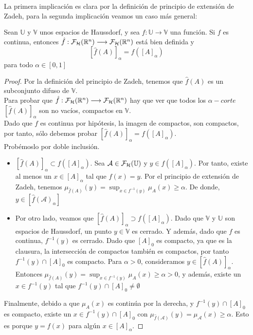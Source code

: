 La primera implicación es clara por la definición de principio de extensión de Zadeh, para la segunda implicación veamos un caso más general:


\begin{teorema}
	Sean $\mathbb{U}$ y $\mathbb{V}$ unos espacios de Haussdorf, y sea $f: \mathbb{U} \longrightarrow \mathbb{V}$ una función. Si $f$ es continua, entonces  $\hat{f} : \mathcal{F}_\mathcal{H}(\mathbb R^n) \longrightarrow \mathcal{F}_\mathcal{H}(\mathbb R^n)$ está bien definida y $$[\hat{f}(A)]_\alpha = f([A]_\alpha)$$
	para todo $\alpha \in [0, 1]$
\end{teorema}

\begin{proof}
	Por la definición del principio de Zadeh, tenemos que $\hat{f}(A)$ es un subconjunto difuso de $\mathbb{V}$. \\
	Para probar que $\hat{f} : \mathcal{F}_\mathcal{H}(\mathbb R^n) \longrightarrow \mathcal{F}_\mathcal{H}(\mathbb R^n)$ hay que ver que todos los $\alpha-corte$ $[\hat{f}(A)]_\alpha$ son no vacíos, compactos en $\mathbb{V}$. \\
	Dado que $f$ es continua por hipótesis, la imagen de compactos, son compactos, por tanto, sólo debemos probar $[\hat{f}(A)]_\alpha = f([A]_\alpha)$. \\
	Probémoslo por doble inclusión.
	
	\begin{itemize}
		\item $[\hat{f}(A)]_\alpha \subset f([A]_\alpha)$. Sea $\mathcal{A} \in \mathcal{F}_\mathcal{H}(\mathbb U)$ y $y \in f([A]_\alpha)$. Por tanto, existe al menos un $x \in [A]_\alpha$ tal que $f(x)=y$. Por el principio de extensión de Zadeh, tenemos $\mu_{\hat{f}(A)}(y)=\sup_{x\in f^{-1}(y)} \mu_A(x) \geq \alpha$. De donde, $y \in [\hat{f}(\mathcal{A})_\alpha]$
		\item Por otro lado, veamos que $[\hat{f}(A)]_\alpha \supset f([A]_\alpha)$. Dado que $\mathbb{V}$ y $\mathbb{U}$ son espacios de Haussdorf, un punto $y \in \mathbb{V}$ es cerrado. Y además, dado que $f$ es continua, $f^{-1}(y)$ es cerrado. Dado que $[A]_0$ es compacto, ya que es la clausura, la intersección de compactos también es compactos, por tanto $f^{-1}(y) \cap [A]_0$ es compacto. Para $\alpha>0$, consideramos $y \in [\hat{f}(A)]_\alpha$. Entonces $\mu_{\hat{f}(A)}(y)=\sup_{x\in f^{-1}(y)} \mu_A(x) \geq \alpha>0$, y además, existe un $x\in f^{-1}(y)$ tal que $f^{-1}(y) \cap [A]_0 \neq \emptyset$
	\end{itemize}
	Finalmente, debido a que $\mu_A(x)$ es continúa por la derecha, y $f^{-1}(y) \cap [A]_0$ es compacto, existe un $x \in f^{-1}(y) \cap [A]_0$ con $\mu_{\hat{f}(\mathcal{A})}(y)=\mu_{\mathcal{A}}(x) \geq \alpha$. Esto es porque $y=f(x)$ para algún $x \in [A]_\alpha$.
	

\end{proof}
